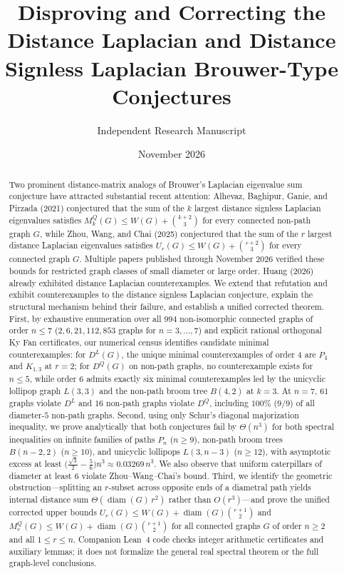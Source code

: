 \documentclass[11pt,a4paper]{article}
\title{\textbf{Disproving and Correcting the Distance Laplacian and Distance Signless Laplacian Brouwer-Type Conjectures}}
\author{Independent Research Manuscript}
\date{November 2026}
\theoremstyle{remark}
\DeclareMathOperator{\diam}{diam}
\begin{document}
\maketitle

\begin{abstract}
Two prominent distance-matrix analogs of Brouwer's Laplacian eigenvalue sum conjecture have attracted substantial recent attention: Alhevaz, Baghipur, Ganie, and Pirzada (2021) conjectured that the sum of the $k$ largest distance signless Laplacian eigenvalues satisfies $M_k^Q(G) \le W(G) + \binom{k+2}{3}$ for every connected non-path graph $G$, while Zhou, Wang, and Chai (2025) conjectured that the sum of the $r$ largest distance Laplacian eigenvalues satisfies $U_r(G) \le W(G) + \binom{r+2}{3}$ for every connected graph $G$. Multiple papers published through November 2026 verified these bounds for restricted graph classes of small diameter or large order. Huang (2026) already exhibited distance Laplacian counterexamples. We extend that refutation and exhibit counterexamples to the distance signless Laplacian conjecture, explain the structural mechanism behind their failure, and establish a unified corrected theorem. First, by exhaustive enumeration over all $994$ non-isomorphic connected graphs of order $n \le 7$ ($2, 6, 21, 112, 853$ graphs for $n=3,\dots,7$) and explicit rational orthogonal Ky Fan certificates, our numerical census identifies candidate minimal counterexamples: for $D^L(G)$, the unique minimal counterexamples of order $4$ are $P_4$ and $K_{1,3}$ at $r=2$; for $D^Q(G)$ on non-path graphs, no counterexample exists for $n \le 5$, while order $6$ admits exactly six minimal counterexamples led by the unicyclic lollipop graph $L(3,3)$ and the non-path broom tree $B(4,2)$ at $k=3$. At $n=7$, $61$ graphs violate $D^L$ and $16$ non-path graphs violate $D^Q$, including $100\%$ ($9/9$) of all diameter-$5$ non-path graphs. Second, using only Schur's diagonal majorization inequality, we prove analytically that both conjectures fail by $\Theta(n^3)$ for both spectral inequalities on infinite families of paths $P_n$ ($n \ge 9$), non-path broom trees $B(n-2,2)$ ($n \ge 10$), and unicyclic lollipops $L(3,n-3)$ ($n \ge 12$), with asymptotic excess at least $\bigl(\frac{\sqrt{3}}{2}-\frac{5}{6}\bigr)n^3 \approx 0.03269\,n^3$. We also observe that uniform caterpillars of diameter at least $6$ violate Zhou--Wang--Chai's bound. Third, we identify the geometric obstruction---splitting an $r$-subset across opposite ends of a diametral path yields internal distance sum $\Theta(\diam(G)\,r^2)$ rather than $O(r^3)$---and prove the unified corrected upper bounds $U_r(G) \le W(G) + \diam(G)\binom{r+1}{2}$ and $M_r^Q(G) \le W(G) + \diam(G)\binom{r+1}{2}$ for all connected graphs $G$ of order $n \ge 2$ and all $1 \le r \le n$. Companion Lean~4 code checks integer arithmetic certificates and auxiliary lemmas; it does not formalize the general real spectral theorem or the full graph-level conclusions.


\end{abstract}
\end{document}
